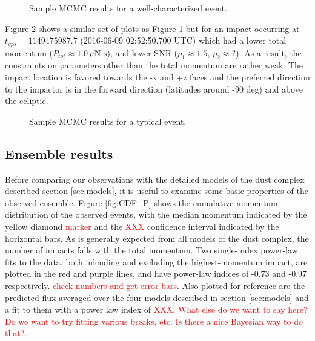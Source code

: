 \documentclass[preprint, trackchanges]{aastex61}
\newcommand{\red}[1]{\textcolor{red}{#1}}
\begin{document}
\begin{figure}[h!]
\caption{Sample MCMC results for a well-characterized event.\label{fig:goodExample}}
\end{figure}

Figure \ref{fig:Example} shows a similar set of plots as Figure \ref{fig:goodExample} but for an impact occurring at $t_{gps} = 1149475987.7$ (2016-06-09 02:52:50.700 UTC) which had a lower total momentum ($P_{tot}\approx1.0\,\mu\textrm{N-s}$), and lower SNR ($\rho_1\approx1.5$, $\rho_2\approx?$). As a result, the constraints on parameters other than the total momentum are rather weak.  The impact location is favored towards the -x and +z faces and the preferred direction to the impactor is in the forward direction (latitudes around -90 deg) and above the ecliptic.
\begin{figure}[h!]
\caption{Sample MCMC results for a typical event.\label{fig:Example}}
\end{figure}

\FloatBarrier
\subsection{Ensemble results}
Before comparing our observations with the detailed models of the dust complex described section \ref{sec:models}, it is useful to examine some basic properties of the observed ensemble. Figure \ref{fig:CDF_P} shows the cumulative momentum distribution of the observed events, with the median momentum indicated by the yellow diamond \red{marker} and the \red{XXX} confidence interval indicated by the horizontal bars.  As is generally expected from all models of the dust complex, the number of impacts falls with the total momentum. Two single-index power-law fits to the data, both inlcuding and excluding the highest-momentum impact, are plotted in the red and purple lines, and have power-law indices of -0.73 and -0.97 respectively. \red{check numbers and get error bars}. Also plotted for reference are the predicted flux averaged over the four models described in section \ref{sec:models} and a fit to them with a power law index of \red{XXX}. \red{What else do we want to say here? Do we want to try fitting various breaks, etc.  Is there a nice Bayesian way to do that?}.
\end{document}
